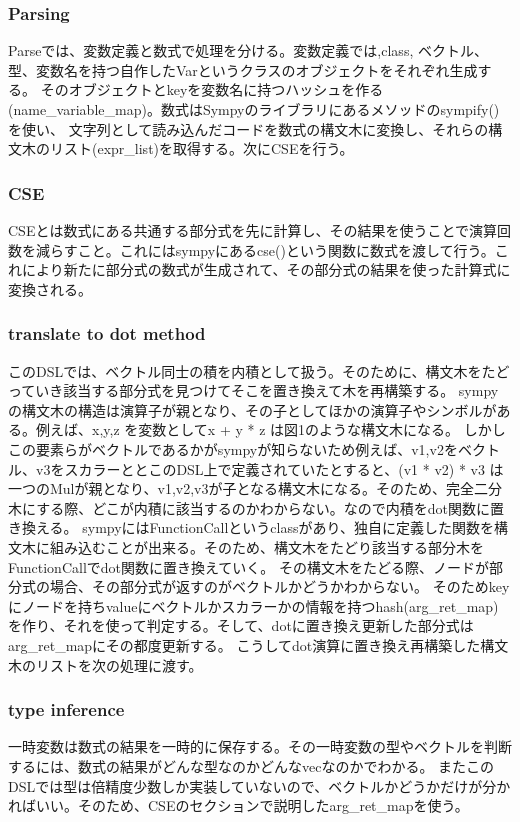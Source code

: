 \documentclass{jarticle}
\begin{document}
\subsubsection{Parsing}
Parseでは、変数定義と数式で処理を分ける。変数定義では,class, ベクトル、型、変数名を持つ自作したVarというクラスのオブジェクトをそれぞれ生成する。
そのオブジェクトとkeyを変数名に持つハッシュを作る(name\_variable\_map)。数式はSympyのライブラリにあるメソッドのsympify()を使い、
文字列として読み込んだコードを数式の構文木に変換し、それらの構文木のリスト(expr\_list)を取得する。次にCSEを行う。


\subsubsection{CSE}

CSEとは数式にある共通する部分式を先に計算し、その結果を使うことで演算回数を減らすこと。これにはsympyにあるcse()という関数に数式を渡して行う。これにより新たに部分式の数式が生成されて、その部分式の結果を使った計算式に変換される。


\subsubsection{translate to dot method}
このDSLでは、ベクトル同士の積を内積として扱う。そのために、構文木をたどっていき該当する部分式を見つけてそこを置き換えて木を再構築する。
sympyの構文木の構造は演算子が親となり、その子としてほかの演算子やシンボルがある。例えば、x,y,z を変数としてx + y * z は図1のような構文木になる。
しかしこの要素らがベクトルであるかがsympyが知らないため例えば、v1,v2をベクトル、v3をスカラーととこのDSL上で定義されていたとすると、(v1 * v2) * v3
は一つのMulが親となり、v1,v2,v3が子となる構文木になる。そのため、完全二分木にする際、どこが内積に該当するのかわからない。なので内積をdot関数に置き換える。
sympyにはFunctionCallというclassがあり、独自に定義した関数を構文木に組み込むことが出来る。そのため、構文木をたどり該当する部分木をFunctionCallでdot関数に置き換えていく。
その構文木をたどる際、ノードが部分式の場合、その部分式が返すのがベクトルかどうかわからない。
そのためkeyにノードを持ちvalueにベクトルかスカラーかの情報を持つhash(arg\_ret\_map)を作り、それを使って判定する。そして、dotに置き換え更新した部分式はarg\_ret\_mapにその都度更新する。
こうしてdot演算に置き換え再構築した構文木のリストを次の処理に渡す。

\subsubsection{type inference}
一時変数は数式の結果を一時的に保存する。その一時変数の型やベクトルを判断するには、数式の結果がどんな型なのかどんなvecなのかでわかる。
またこのDSLでは型は倍精度少数しか実装していないので、ベクトルかどうかだけが分かればいい。そのため、CSEのセクションで説明したarg\_ret\_mapを使う。
\end{document}
